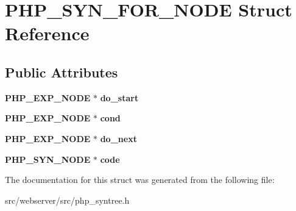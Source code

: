 \section{PHP\_\-SYN\_\-FOR\_\-NODE Struct Reference}
\label{structPHP__SYN__FOR__NODE}
\subsection*{Public Attributes}
\begin{DoxyCompactItemize}
\item 
{\bf PHP\_\-EXP\_\-NODE} $\ast$ {\bfseries do\_\-start}\label{structPHP__SYN__FOR__NODE_a81086f5485ea9ac3b724f458f34eea8a}

\item 
{\bf PHP\_\-EXP\_\-NODE} $\ast$ {\bfseries cond}\label{structPHP__SYN__FOR__NODE_a98078c330b98ad8eb788dadea795db5f}

\item 
{\bf PHP\_\-EXP\_\-NODE} $\ast$ {\bfseries do\_\-next}\label{structPHP__SYN__FOR__NODE_afcb929ce18d60648634fe55cb6e4fdb3}

\item 
{\bf PHP\_\-SYN\_\-NODE} $\ast$ {\bfseries code}\label{structPHP__SYN__FOR__NODE_a656e3d9dc3714066f8732974ae0de5d8}

\end{DoxyCompactItemize}


The documentation for this struct was generated from the following file:\begin{DoxyCompactItemize}
\item 
src/webserver/src/php\_\-syntree.h\end{DoxyCompactItemize}
